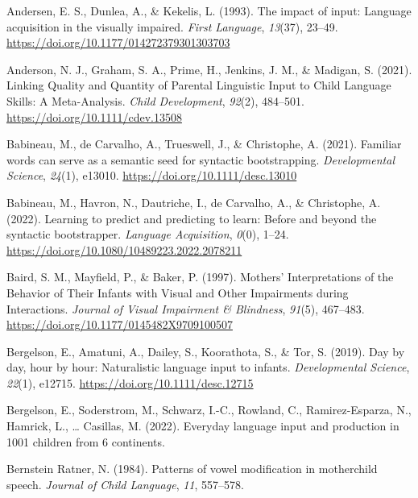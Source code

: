 \documentclass[
  man,floatsintext]{apa6}
\newlength{\cslhangindent}
\newlength{\cslentryspacingunit} %
\newenvironment{CSLReferences}[2] %
 {%
  \setlength{\parindent}{0pt}
  \ifodd #1
  \let\oldpar\par
  \def\par{\hangindent=\cslhangindent\oldpar}
  \fi
  \setlength{\parskip}{#2\cslentryspacingunit}
 }%
 {}
\begin{document}
\hypertarget{refs}{}
\begin{CSLReferences}{1}{0}
\leavevmode{}%
Andersen, E. S., Dunlea, A., \& Kekelis, L. (1993). The impact of input: Language acquisition in the visually impaired. \emph{First Language}, \emph{13}(37), 23--49. \url{https://doi.org/10.1177/014272379301303703}

\leavevmode{}%
Anderson, N. J., Graham, S. A., Prime, H., Jenkins, J. M., \& Madigan, S. (2021). Linking {Quality} and {Quantity} of {Parental Linguistic Input} to {Child Language Skills}: {A Meta-Analysis}. \emph{Child Development}, \emph{92}(2), 484--501. \url{https://doi.org/10.1111/cdev.13508}

\leavevmode{}%
Babineau, M., de Carvalho, A., Trueswell, J., \& Christophe, A. (2021). Familiar words can serve as a semantic seed for syntactic bootstrapping. \emph{Developmental Science}, \emph{24}(1), e13010. \url{https://doi.org/10.1111/desc.13010}

\leavevmode{}%
Babineau, M., Havron, N., Dautriche, I., de Carvalho, A., \& Christophe, A. (2022). Learning to predict and predicting to learn: {Before} and beyond the syntactic bootstrapper. \emph{Language Acquisition}, \emph{0}(0), 1--24. \url{https://doi.org/10.1080/10489223.2022.2078211}

\leavevmode{}%
Baird, S. M., Mayfield, P., \& Baker, P. (1997). Mothers' {Interpretations} of the {Behavior} of {Their Infants} with {Visual} and {Other Impairments} during {Interactions}. \emph{Journal of Visual Impairment \& Blindness}, \emph{91}(5), 467--483. \url{https://doi.org/10.1177/0145482X9709100507}

\leavevmode{}%
Bergelson, E., Amatuni, A., Dailey, S., Koorathota, S., \& Tor, S. (2019). Day by day, hour by hour: {Naturalistic} language input to infants. \emph{Developmental Science}, \emph{22}(1), e12715. \url{https://doi.org/10.1111/desc.12715}

\leavevmode{}%
Bergelson, E., Soderstrom, M., Schwarz, I.-C., Rowland, C., Ramirez-Esparza, N., Hamrick, L., \ldots{} Casillas, M. (2022). Everyday language input and production in 1001 children from 6 continents.

\leavevmode{}%
Bernstein Ratner, N. (1984). Patterns of vowel modification in mother\textendash child speech. \emph{Journal of Child Language}, \emph{11}, 557--578.


\end{CSLReferences}
\end{document}
